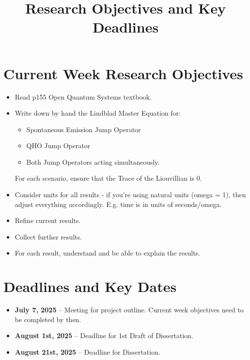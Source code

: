 \documentclass[11pt]{article}
\title{Research Objectives and Key Deadlines}
\begin{document}
\maketitle

\section*{Current Week Research Objectives}

\begin{itemize}[leftmargin=1.5em]
    \item Read p155 Open Quantum Systems textbook. 
    \item Write down by hand the Lindblad Master Equation for:
    \begin{itemize}
        \item Spontaneous Emission Jump Operator
        \item QHO Jump Operator
        \item Both Jump Operators acting simultaneously.
    \end{itemize}
    For each scenario, ensure that the Trace of the Liouvillian is $0$. 
    \item Consider units for all results - if you're using natural units (omega = 1), then adjust everything accordingly. E.g. time is in units of seconds/omega.
    \item Refine current results.
    \item Collect further results.
    \item For each result, understand and be able to explain the results. 
\end{itemize}

\vspace{1cm}

\section*{Deadlines and Key Dates}

\begin{itemize}[leftmargin=1.5em]
    \item \textbf{July 7, 2025} -- Meeting for project outline. Current week objectives need to be completed by then. 
    \item \textbf{August 1st, 2025} -- Deadline for 1st Draft of Dissertation. 
    \item \textbf{August 21st, 2025} -- Deadline for Dissertation.
\end{itemize}
\end{document}
